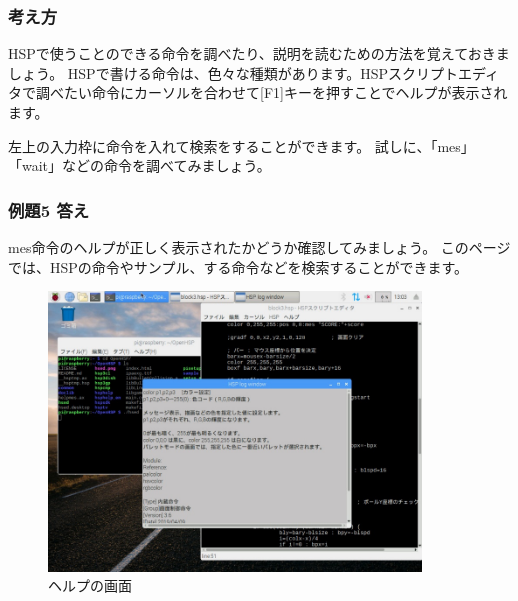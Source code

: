 \subsubsection*{考え方}

HSPで使うことのできる命令を調べたり、説明を読むための方法を覚えておきましょう。
HSPで書ける命令は、色々な種類があります。HSPスクリプトエディタで調べたい命令にカーソルを合わせて[F1]キーを押すことでヘルプが表示されます。

左上の入力枠に命令を入れて検索をすることができます。
試しに、「mes」「wait」などの命令を調べてみましょう。

\subsubsection*{例題5 答え}

mes命令のヘルプが正しく表示されたかどうか確認してみましょう。
このページでは、HSPの命令やサンプル、する命令などを検索することができます。

\begin{figure}[H]
    \begin{center}
        \includegraphics[keepaspectratio,width=9.895cm,height=7.421cm]{text02-img/text02-img029.jpg}
        \caption{ヘルプの画面}
    \end{center}
\end{figure}